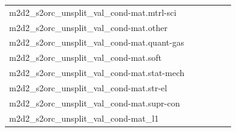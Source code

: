 \documentclass[dvipsnames]{article}
\begin{document}
\begin{appendix}
{\begin{longtable}{m{6cm}m{1.7cm}m{1.7cm}m{1.7cm}m{1.7cm}m{1.7cm}}
	m2d2\_s2orc\_unsplit\_val\_cond-mat.mtrl-sci  & \colorbox[HTML]{d7efa2}{\makebox[\mywidth][c]{12.19}} & \colorbox[HTML]{ecf7b1}{\makebox[\mywidth][c]{12.33}} & \colorbox[HTML]{ffffe5}{\makebox[\mywidth][c]{14.09}} & \colorbox[HTML]{d4eea0}{\makebox[\mywidth][c]{12.18}} & \colorbox[HTML]{77c578}{\makebox[\mywidth][c]{11.91}}\\
	m2d2\_s2orc\_unsplit\_val\_cond-mat.other  & \colorbox[HTML]{d1ec9f}{\makebox[\mywidth][c]{11.87}} & \colorbox[HTML]{e5f4ab}{\makebox[\mywidth][c]{11.96}} & \colorbox[HTML]{ffffe5}{\makebox[\mywidth][c]{13.55}} & \colorbox[HTML]{c6e89a}{\makebox[\mywidth][c]{11.83}} & \colorbox[HTML]{77c578}{\makebox[\mywidth][c]{11.65}}\\
	m2d2\_s2orc\_unsplit\_val\_cond-mat.quant-gas  & \colorbox[HTML]{c6e89a}{\makebox[\mywidth][c]{11.67}} & \colorbox[HTML]{e1f3a9}{\makebox[\mywidth][c]{11.78}} & \colorbox[HTML]{ffffe5}{\makebox[\mywidth][c]{13.37}} & \colorbox[HTML]{c3e698}{\makebox[\mywidth][c]{11.67}} & \colorbox[HTML]{77c578}{\makebox[\mywidth][c]{11.50}}\\
	m2d2\_s2orc\_unsplit\_val\_cond-mat.soft  & \colorbox[HTML]{bfe596}{\makebox[\mywidth][c]{12.18}} & \colorbox[HTML]{cdeb9d}{\makebox[\mywidth][c]{12.23}} & \colorbox[HTML]{ffffe5}{\makebox[\mywidth][c]{13.93}} & \colorbox[HTML]{bee496}{\makebox[\mywidth][c]{12.18}} & \colorbox[HTML]{77c578}{\makebox[\mywidth][c]{12.02}}\\
	m2d2\_s2orc\_unsplit\_val\_cond-mat.stat-mech  & \colorbox[HTML]{bfe596}{\makebox[\mywidth][c]{12.03}} & \colorbox[HTML]{e0f2a8}{\makebox[\mywidth][c]{12.14}} & \colorbox[HTML]{ffffe5}{\makebox[\mywidth][c]{13.60}} & \colorbox[HTML]{d1ec9f}{\makebox[\mywidth][c]{12.08}} & \colorbox[HTML]{77c578}{\makebox[\mywidth][c]{11.89}}\\
	m2d2\_s2orc\_unsplit\_val\_cond-mat.str-el  & \colorbox[HTML]{c6e89a}{\makebox[\mywidth][c]{10.39}} & \colorbox[HTML]{e2f3a9}{\makebox[\mywidth][c]{10.50}} & \colorbox[HTML]{ffffe5}{\makebox[\mywidth][c]{11.98}} & \colorbox[HTML]{cae99c}{\makebox[\mywidth][c]{10.41}} & \colorbox[HTML]{77c578}{\makebox[\mywidth][c]{10.22}}\\
	m2d2\_s2orc\_unsplit\_val\_cond-mat.supr-con  & \colorbox[HTML]{dff2a7}{\makebox[\mywidth][c]{11.57}} & \colorbox[HTML]{edf8b2}{\makebox[\mywidth][c]{11.66}} & \colorbox[HTML]{ffffe5}{\makebox[\mywidth][c]{13.13}} & \colorbox[HTML]{d8efa2}{\makebox[\mywidth][c]{11.53}} & \colorbox[HTML]{77c578}{\makebox[\mywidth][c]{11.30}}\\
	m2d2\_s2orc\_unsplit\_val\_cond-mat\_l1  & \colorbox[HTML]{bfe596}{\makebox[\mywidth][c]{12.54}} & \colorbox[HTML]{e1f3a9}{\makebox[\mywidth][c]{12.67}} & \colorbox[HTML]{ffffe5}{\makebox[\mywidth][c]{14.28}} & \colorbox[HTML]{ccea9c}{\makebox[\mywidth][c]{12.58}} & \colorbox[HTML]{77c578}{\makebox[\mywidth][c]{12.38}}\\

\end{longtable}}
\end{appendix}
\end{document}
